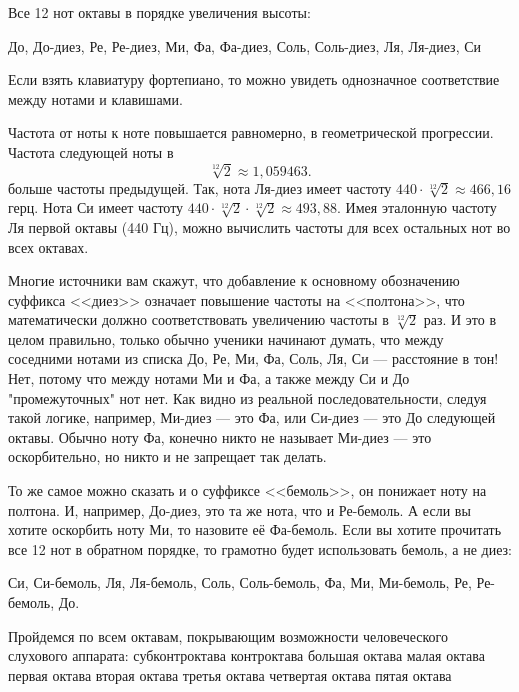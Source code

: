 Все 12 нот октавы в порядке увеличения высоты:

До, До-диез, Ре, Ре-диез, Ми, Фа, Фа-диез, Соль, Соль-диез, Ля, Ля-диез, Си

Если взять клавиатуру фортепиано, то можно увидеть однозначное соответствие между нотами и клавишами.

Частота от ноты к ноте повышается равномерно, в геометрической прогрессии. Частота следующей ноты в \[\sqrt[12]{2}\approx 1,059463.\] больше частоты предыдущей. Так, нота Ля-диез имеет частоту $440\cdot\sqrt[12]{2}\approx 466,16$ герц. Нота Си имеет частоту $440\cdot\sqrt[12]{2}\cdot\sqrt[12]{2}\approx 493,88$. Имея эталонную частоту Ля первой октавы (440 Гц), можно вычислить частоты для всех остальных нот во всех октавах.

Многие источники вам скажут, что добавление к основному обозначению суффикса <<диез>> означает повышение частоты на <<полтона>>, что математически должно соответствовать увеличению частоты в $\sqrt[12]{2}$ раз. И это в целом правильно, только обычно ученики начинают думать, что между соседними нотами из списка До, Ре, Ми, Фа, Соль, Ля, Си --- расстояние в тон! Нет, потому что между нотами Ми и Фа, а также между Си и До "промежуточных" нот нет. Как видно из реальной последовательности, следуя такой логике, например, Ми-диез --- это Фа, или Си-диез --- это До следующей октавы. Обычно ноту Фа, конечно никто не называет Ми-диез --- это оскорбительно, но никто и не запрещает так делать. 

То же самое можно сказать и о суффиксе <<бемоль>>, он понижает ноту на полтона. И, например, До-диез, это та же нота, что и Ре-бемоль. А если вы хотите оскорбить ноту Ми, то назовите её Фа-бемоль. Если вы хотите прочитать все 12 нот в обратном порядке, то грамотно будет использовать бемоль, а не диез:

Си, Си-бемоль, Ля, Ля-бемоль, Соль, Соль-бемоль, Фа, Ми, Ми-бемоль, Ре, Ре-бемоль, До.


Пройдемся по всем октавам, покрывающим возможности человеческого слухового аппарата:
субконтроктава
контроктава
большая октава
малая октава
первая октава
вторая октава
третья октава
четвертая октава
пятая октава


